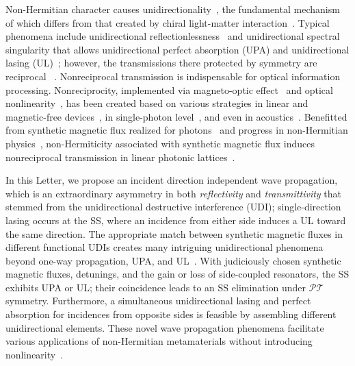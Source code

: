 \documentclass[prl,showpacs,superscriptaddress,twocolumn]{revtex4-1}
\begin{document}
Non-Hermitian character causes unidirectionality~\cite%
{PengPNAS,Peschel,LFeng,USS,LJINSR,UPA}, the fundamental mechanism of which
differs from that created by chiral light-matter interaction~\cite%
{TR,TRPRA,PL,PRA93,PZ}. Typical phenomena include unidirectional
reflectionlessness~\cite{Peschel,LFeng} and unidirectional spectral
singularity that allows unidirectional perfect absorption (UPA) and
unidirectional lasing (UL)~\cite{USS,UPA}; however, the transmissions there
protected by symmetry are reciprocal~\cite{XYin,Jalas,MugaPR,PTScattAnnPhys}%
. Nonreciprocal transmission is indispensable for optical information
processing. Nonreciprocity, implemented via magneto-optic effect~\cite{LBi}
and optical nonlinearity~\cite{LFan}, has been created based on various
strategies in linear and magnetic-free devices~\cite{ZYu,DWWang}, in
single-photon level~\cite{BDayan2014,BDayan2016}, and even in acoustics~\cite%
{Fleury2014}. Benefitted from synthetic magnetic flux realized for photons~%
\cite{Fang12,Tzuang14,LLu,ELi,SLonghiOL14,Hafezi2011,Hafezi,HafeziIJMPB,NP13}
and progress in non-Hermitian physics~\cite{PTRev}, non-Hermiticity
associated with synthetic magnetic flux induces nonreciprocal transmission
in linear photonic lattices~\cite{LonghiOL,LXQ,JLNJP}.

In this Letter, we propose an incident direction independent wave
propagation, which is an extraordinary asymmetry in both \emph{reflectivity}
and \emph{transmittivity} that stemmed from the unidirectional destructive
interference (UDI); single-direction lasing occurs at the SS, where an
incidence from either side induces a UL toward the same direction. The
appropriate match between synthetic magnetic fluxes in different functional
UDIs creates many intriguing unidirectional phenomena beyond one-way
propagation, UPA, and UL~\cite{JLNJP}. With judiciously chosen synthetic
magnetic fluxes, detunings, and the gain or loss of side-coupled resonators,
the SS exhibits UPA or UL; their coincidence leads to an SS elimination
under $\mathcal{PT}$ symmetry. Furthermore, a simultaneous unidirectional
lasing and perfect absorption for incidences from opposite sides is feasible
by assembling different unidirectional elements. These novel wave
propagation phenomena facilitate various applications of non-Hermitian
metamaterials without introducing nonlinearity~\cite%
{SLonghi15,Lepri,NL,VVKRMP}.
\end{document}
